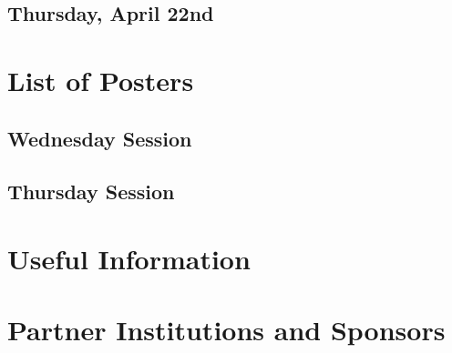 \documentclass[openany, parskip=full, 12pt, a4, DIV=16]{scrbook}
\begin{document}
\newpage
\section{Thursday, April 22nd}







\newpage
\chapter{List of Posters} 

\vspace{-2.5em}

\section{Wednesday Session}


\newpage
\section{Thursday Session}





 
% 
 
\chapter{Useful Information}



\chapter{Partner Institutions and Sponsors}



\newpage


\pagecolor{myblue}
\thispagestyle{empty}
\mbox{}
\end{document}
